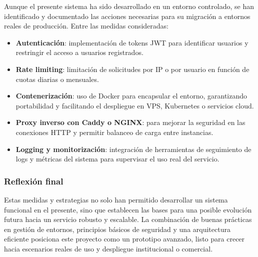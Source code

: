Aunque el presente sistema ha sido desarrollado en un entorno controlado, se han identificado y documentado las acciones necesarias para su migración a entornos reales de producción. Entre las medidas consideradas:

\begin{itemize}
    \item \textbf{Autenticación}: implementación de tokens JWT para identificar usuarios y restringir el acceso a usuarios registrados.
    \item \textbf{Rate limiting}: limitación de solicitudes por IP o por usuario en función de cuotas diarias o mensuales.
    \item \textbf{Contenerización}: uso de Docker para encapsular el entorno, garantizando portabilidad y facilitando el despliegue en VPS, Kubernetes o servicios cloud.
    \item \textbf{Proxy inverso con Caddy o NGINX}: para mejorar la seguridad en las conexiones HTTP y permitir balanceo de carga entre instancias.
    \item \textbf{Logging y monitorización}: integración de herramientas de seguimiento de logs y métricas del sistema para supervisar el uso real del servicio.
\end{itemize}

\subsubsection{Reflexión final}

Estas medidas y estrategias no solo han permitido desarrollar un sistema funcional en el presente, sino que establecen las bases para una posible evolución futura hacia un servicio robusto y escalable. La combinación de buenas prácticas en gestión de entornos, principios básicos de seguridad y una arquitectura eficiente posiciona este proyecto como un prototipo avanzado, listo para crecer hacia escenarios reales de uso y despliegue institucional o comercial.
